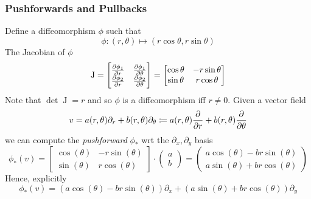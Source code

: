 \subsubsection{Pushforwards and Pullbacks}\label{subsubsec:diffgeo}

Define a diffeomorphism \(\phi\) such that
%
\begin{equation}
    \phi\colon (r, \theta) \mapsto (r \cos \theta, r \sin \theta)
\end{equation}
%
The Jacobian of \(\phi\)
%
\begin{equation}
    \operatorname{J}
    =
    \begin{bmatrix}
        \pdv{\phi_1}{r} & \pdv{\phi_1}{\theta} \\
        \pdv{\phi_2}{r} & \pdv{\phi_2}{\theta}
    \end{bmatrix}
    =
    \begin{bmatrix}
        \cos \theta & -r \sin \theta \\
        \sin \theta & r \cos \theta
    \end{bmatrix}
\end{equation}
%
Note that \(\det \operatorname{J} = r\) and so \(\phi\) is a diffeomorphism iff \(r \neq 0\).
%
Given a vector field
%
\begin{equation}
    v = a(r, \theta) \partial_r + b(r, \theta)\partial_\theta \coloneqq a(r, \theta) \pdv{}{r} + b(r, \theta)\pdv{}{\theta}
\end{equation}
%
we can compute the \textit{pushforward} \(\phi_*\) wrt the \(\partial_x, \partial_y\) basis
\begin{equation}
    \phi_* (v)
    =
    \begin{bmatrix}
        \cos (\theta) & -r \sin (\theta) \\
        \sin (\theta) & r \cos (\theta)
    \end{bmatrix}
    \cdot
    \begin{pmatrix}
        a \\ b
    \end{pmatrix}
    =
    \begin{pmatrix}
        a \cos (\theta) - br \sin (\theta) \\
        a\sin (\theta) + br \cos (\theta)
    \end{pmatrix}
\end{equation}
Hence, explicitly
\begin{equation}
    \phi_* (v) = (a \cos (\theta) - br \sin (\theta))\partial_x + (a\sin (\theta) + br \cos (\theta))\partial_y
\end{equation}

